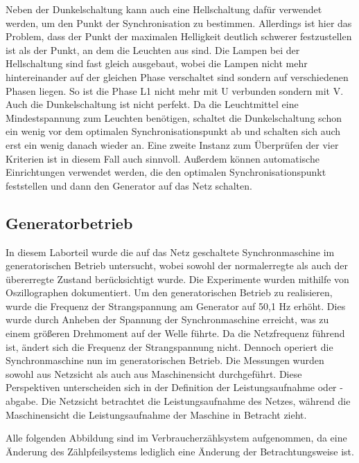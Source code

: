 \documentclass{report}
\begin{document}
Neben der Dunkelschaltung kann auch eine Hellschaltung dafür verwendet werden, um den Punkt der Synchronisation zu bestimmen. Allerdings ist hier das Problem, dass der Punkt der maximalen Helligkeit deutlich schwerer festzustellen ist als der Punkt, an dem die Leuchten aus sind. Die Lampen bei der Hellschaltung sind fast gleich ausgebaut, wobei die Lampen nicht mehr hintereinander auf der gleichen Phase verschaltet sind sondern auf verschiedenen Phasen liegen. So ist die Phase L1 nicht mehr mit U verbunden sondern mit V.
Auch die Dunkelschaltung ist nicht perfekt. Da die Leuchtmittel eine Mindestspannung zum Leuchten benötigen, schaltet die Dunkelschaltung schon ein wenig vor dem optimalen Synchronisationspunkt ab und schalten sich auch erst ein wenig danach wieder an. Eine zweite Instanz zum Überprüfen der vier Kriterien ist in diesem Fall auch sinnvoll. Außerdem können automatische Einrichtungen verwendet werden, die den optimalen Synchronisationspunkt feststellen und dann den Generator auf das Netz schalten.

\subsection{Generatorbetrieb}
\label{sec:generatorbetrieb}

In diesem Laborteil wurde die auf das Netz geschaltete Synchronmaschine im generatorischen Betrieb untersucht, wobei sowohl der normalerregte als auch der übererregte Zustand berücksichtigt wurde. Die Experimente wurden mithilfe von Oszillographen dokumentiert. Um den generatorischen Betrieb zu realisieren, wurde die Frequenz der Strangspannung am Generator auf 50,1 Hz erhöht. Dies wurde durch Anheben der Spannung der Synchronmaschine erreicht, was zu einem größeren Drehmoment auf der Welle führte. Da die Netzfrequenz führend ist, ändert sich die Frequenz der Strangspannung nicht. Dennoch operiert die Synchronmaschine nun im generatorischen Betrieb. Die Messungen wurden sowohl aus Netzsicht als auch aus Maschinensicht durchgeführt. Diese Perspektiven unterscheiden sich in der Definition der Leistungsaufnahme oder -abgabe. Die Netzsicht betrachtet die Leistungsaufnahme des Netzes, während die Maschinensicht die Leistungsaufnahme der Maschine in Betracht zieht.

Alle folgenden Abbildung sind im Verbraucherzählsystem aufgenommen, da eine Änderung des Zählpfeilsystems lediglich eine Änderung der Betrachtungsweise ist.
\end{document}
